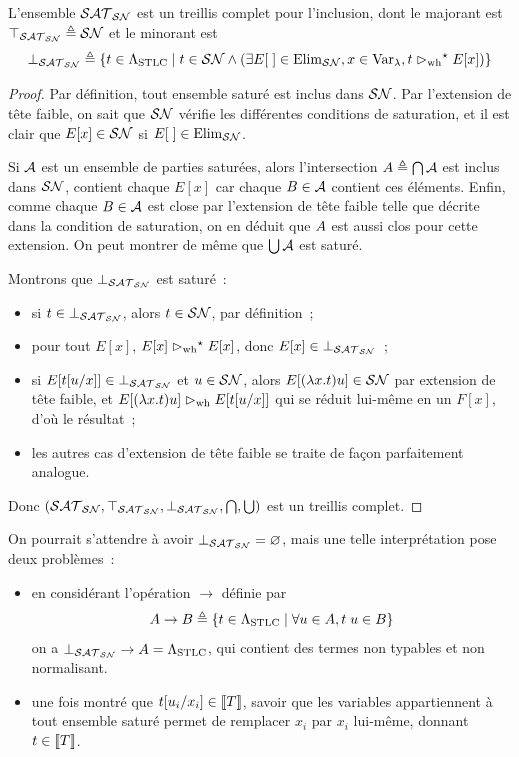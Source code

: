 \begin{proposition}
  L'ensemble $\mathcal{SAT}_{\mathcal{SN}}$ est un treillis complet pour l'inclusion, dont le
  majorant est $\top_{\mathcal{SAT}_{\mathcal{SN}}}\triangleq \mathcal{SN}$ et le minorant est
  \[\bot_{\mathcal{SAT}_{\mathcal{SN}}} \triangleq
  \left\{ t\in\Lambda_{\mathrm{STLC}} \;\middle\vert\; t\in\mathcal{SN} \land (\exists E[\;]\in\mathrm{Elim}_{\mathcal{SN}}, x \in \operatorname{Var}_{\lambda},
    t\mathrel{\rhd_{\mathrm{wh}}}^{\mathord{\star}} E[x]) \right\}\]
\end{proposition}

\begin{proof}
  Par définition, tout ensemble saturé est inclus dans $\mathcal{SN}$. Par l'extension
  de tête faible, on sait que $\mathcal{SN}$ vérifie les différentes conditions de
  saturation, et il est clair que $E[x] \in \mathcal{SN}$ si $E[\;]\in \mathrm{Elim}_{\mathcal{SN}}$.

  Si $\mathcal A$ est un ensemble de parties saturées, alors l'intersection
  $A \triangleq \bigcap \mathcal A$ est inclus dans $\mathcal{SN}$, contient chaque
  $E[x]$ car chaque $B \in \mathcal A$ contient ces éléments. Enfin, comme
  chaque $B \in \mathcal A$ est close par l'extension de tête faible telle
  que décrite dans la condition de saturation, on en déduit que $A$ est
  aussi clos pour cette extension. On peut montrer de même que $\bigcup \mathcal A$
  est saturé.

  Montrons que $\bot_{\mathcal{SAT}_{\mathcal{SN}}}$ est saturé~:
  \begin{itemize}
  \item si $t \in \bot_{\mathcal{SAT}_{\mathcal{SN}}}$, alors $t \in \mathcal{SN}$, par définition~;
  \item pour tout $E[x]$, $E[x]\mathrel{\rhd_{\mathrm{wh}}}^{\mathord{\star}} E[x]$, donc
    $E[x]\in\bot_{\mathcal{SAT}_{\mathcal{SN}}}$~;
  \item si $E[t[u/x]] \in \bot_{\mathcal{SAT}_{\mathcal{SN}}}$ et $u \in \mathcal{SN}$, alors
    $E[(\lambda x.t)u] \in \mathcal{SN}$ par extension de tête faible, et
    $E[(\lambda x.t)u] \mathrel{\rhd_{\mathrm{wh}}} E[t[u/x]]$ qui se réduit lui-même en un
    $F[x]$, d'où le résultat~;
  \item les autres cas d'extension de tête faible se traite de façon
    parfaitement analogue.
  \end{itemize}
  Donc $(\mathcal{SAT}_{\mathcal{SN}},\top_{\mathcal{SAT}_{\mathcal{SN}}},\bot_{\mathcal{SAT}_{\mathcal{SN}}},\bigcap,\bigcup)$ est un treillis
  complet.
\end{proof}

\begin{remark}
  On pourrait s'attendre à avoir $\bot_{\mathcal{SAT}_{\mathcal{SN}}} = \varnothing$, mais une telle
  interprétation pose deux problèmes~:
  \begin{itemize}
  \item en considérant l'opération $\to$ définie par
    \[A \to B \triangleq
    \left\{ t \in \Lambda_{\mathrm{STLC}} \;\middle\vert\; \forall u \in A, t\;u \in B \right\}\]
    on a $\bot_{\mathcal{SAT}_{\mathcal{SN}}} \to A = \Lambda_{\mathrm{STLC}}$, qui contient des termes non
    typables et non normalisant.
  \item une fois montré que $t[u_i/x_i] \in \llbracket T\rrbracket$, savoir que les
    variables appartiennent à tout ensemble saturé permet de remplacer
    $x_i$ par $x_i$ lui-même, donnant $t \in \llbracket T\rrbracket$.
  \end{itemize}
\end{remark}

